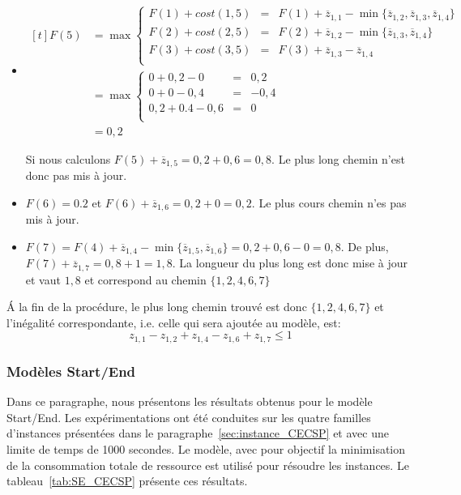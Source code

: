 \begin{ex}
\begin{itemize}
\item $\begin{aligned}[t] 
    F(5) &=  \max \left\{
        \begin{array}{lcl}
          F(1) + cost (1,5) & = & F(1) + \overline{z}_{1,1}  -
                                  \min\{\overline{z}_{1,2},\overline{z}_{1,3},\overline{z}_{1,4}\} 
          \\ 
          F(2) + cost (2,5) &= & F(2) + \overline{z}_{1,2} -
                             \min\{\overline{z}_{1,3}, \overline{z}_{1,4}\}\\
          F(3) + cost (3,5) &= & F(3) + \overline{z}_{1,3} -
                             \overline{z}_{1,4} \\
        \end{array} \right.\\
      &=  \max \left\{ 
        \begin{array}{lcl}
          0 + 0,2 - 0 &=& 0,2 \\
          0 + 0 - 0,4 &= &-0,4 \\
          0,2 + 0.4 - 0,6 &= & 0 \\ 
        \end{array} \right.\\
    &=  0,2
  \end{aligned}$

  Si nous calculons $F(5)+\overline{z}_{1,5}=0,2+0,6=0,8$. Le plus
  long chemin n'est donc pas mis à jour. 

\item $F(6)= 0.2$ et $F(6)+\overline{z}_{1,6}=0,2+0=0,2$. Le plus cours 
  chemin n'es pas mis à jour. 
\item $F(7) = F(4) +\overline{z}_{1,4} -
  \min\{\overline{z}_{1,5},\overline{z}_{1,6}\}= 0,2 + 0,6 - 0 =
  0,8$. De plus, $F(7)+\overline{z}_{1,7}=0,8+1=1,8$. La longueur du
  plus long est donc mise à jour et vaut $1,8$ et correspond au chemin $\{1,2,4,6,7\}$
\end{itemize}

{\'A} la fin de la procédure, le plus long chemin trouvé est donc
$\{1,2,4,6,7\}$ et l'inégalité correspondante, i.e. celle qui sera
ajoutée au modèle, est:
\[  z_{1,1} - z_{1,2} + z_{1,4} - z_{1,6} + z_{1,7} \le 1  \]
\end{ex}  

\subsubsection{Modèles Start/End}
Dans ce paragraphe, nous présentons les résultats obtenus pour le
modèle Start/End.  Les expérimentations ont été conduites
sur les quatre familles d'instances présentées dans le
paragraphe~\ref{sec:instance_CECSP} et avec une limite de temps de
1000 secondes. Le modèle, avec pour objectif la minimisation de la
consommation totale de ressource est utilisé
pour résoudre les instances. Le
tableau~\ref{tab:SE_CECSP} présente ces résultats.

